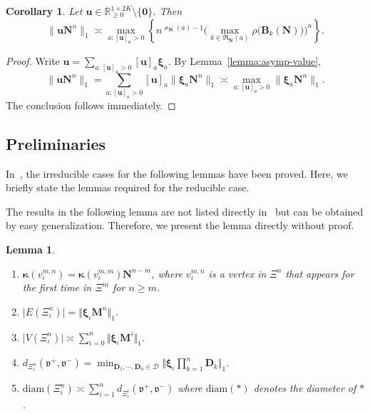 \documentclass[12pt]{iopart}
\newtheorem{lemma}[theorem]{Lemma}
\newtheorem{corollary}[theorem]{Corollary}
\newcommand*{\dist}{d}
\newcommand*{\bkappa}{\boldsymbol{\kappa}}
\newcommand*{\bbbxi}{\boldsymbol{\xi}}
\newcommand*{\diam}{\mathrm{diam}}
\begin{document}
\begin{corollary}\label{cor:row-vector-asymp}
Let $\mathbf u\in\mathbb R_{\ge 0}^{1\times 2K}\setminus\{\mathbf 0\}$.
Then
\[
\big\|\mathbf u \mathbf N^n\big\|_1
\asymp
\max_{a:[\mathbf u]_a>0}
\left\{
n^{\varkappa_{\mathbf N}(a)-1}
\Big(
\max_{k\in\mathfrak R_{\mathbf N}(a)}
\rho\big(\mathbf B_k(\mathbf N)\big)
\Big)^n
\right\}.
\]
\end{corollary}

\begin{proof}
Write
$
\mathbf u=\sum_{a:[\mathbf u]_a>0}[\mathbf u]_a\bbbxi_a.
$
By Lemma~\ref{lemma:asymp-value},
\[
\big\|\mathbf u \mathbf N^n\big\|_1
=
\sum_{a: [\mathbf u]_a>0} [\mathbf u]_a\big\|\bbbxi_a \mathbf N^n\big\|_1
\asymp
\max_{a:[\mathbf u]_a>0}\big\|\bbbxi_a \mathbf N^n\big\|_1.
\]
The conclusion follows immediately.
\end{proof}


\subsection{Preliminaries}

In~\cite{li2024scale,neroli2024fractal}, the irreducible cases for the following lemmas have been proved.
Here, we briefly state the lemmas required for the reducible case.

The results in the following lemma are not listed directly in~\cite{li2024scale,neroli2024fractal} 
but can be obtained by easy generalization. 
Therefore, we present the lemma directly without proof.

\begin{lemma}\label{lemma:preivous_results}
\begin{enumerate}[label=(\roman*)]
    \item $\bkappa (v_{\iota}^{m,n})= \bkappa(v_{\iota}^{m,m}) \mathbf{N}^{n-m}$, 
          where $v_{\iota}^{m,n}$ is a vertex in $\Xi^n$ that appears for the first time in $\Xi^m$ for $n \geq m$.
    \item $\big|E(\Xi_{\iota}^n)\big|=\big\Vert \bbbxi_\iota  \mathbf{M}^n \big\Vert_1 $.
    \item $\displaystyle\big|V(\Xi_{\iota}^n)\big|\asymp \sum_{i=0}^n \big\Vert \bbbxi_\iota  \mathbf{M}^i \big\Vert_1$.
    \item $\dist_{\Xi_\iota^n}(\mathfrak{v}^+,\mathfrak{v}^-) 
    = \min_{\mathbf D_1,\cdots,\mathbf D_n \in \mathcal D} \big\Vert \bbbxi_\iota\prod_{k=1}^n \mathbf D_k\big\Vert_1$.
    \item $\displaystyle\diam(\Xi_\iota^n) \asymp \sum_{i=1}^n \dist_{\Xi_\iota^i}(\mathfrak{v}^+,\mathfrak{v}^-)$ 
    where $\diam(*)$ denotes the diameter of $*$ .
\end{enumerate}
\end{lemma}
\end{document}
